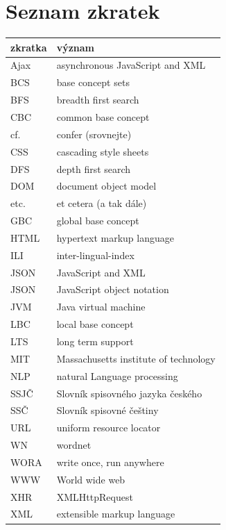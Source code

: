 \documentclass[a4paper, 11pt, oneside, showtrims]{book}
\begin{document}
		\chapter*{Seznam zkratek}
		\label{cha:seznamzkratek}

			\begin{table}[h!]
			\label{tab:seznamzkratek}

				\begin{tabular}{l | l}
					zkratka & význam \\\hline
					Ajax & asynchronous JavaScript and XML \\
					BCS & base concept sets \\
					BFS & breadth first search \\
					CBC & common base concept \\
					cf. & confer (srovnejte) \\
					CSS & cascading style sheets \\
					DFS & depth	first search \\
					DOM & document object model \\
					etc. & et cetera (a tak dále) \\
					GBC & global base concept \\
					HTML & hypertext markup language \\
					ILI & inter-lingual-index \\
					JSON & JavaScript and XML \\
					JSON & JavaScript object notation \\
					JVM & Java virtual machine \\
					LBC & local base concept \\
					LTS & long term support \\
					MIT & Massachusetts institute of technology \\
					NLP & natural Language processing \\
					SSJČ & Slovník spisovného jazyka českého \\
					SSČ & Slovník spisovné češtiny \\
					URL & uniform resource locator \\
					WN & wordnet \\
					WORA & write once, run anywhere \\ 
					WWW & World wide web \\
					XHR & XMLHttpRequest \\
					XML & extensible markup language \\
				\end{tabular}
			\end{table}
\end{document}
